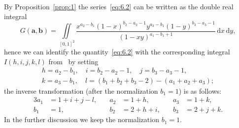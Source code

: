 \documentclass[a4paper,twoside]{article}
\numberwithin{equation}{section}
\renewcommand{\[}{\lfloor}
\renewcommand{\]}{\rfloor}
\newcommand{\<}{\langle}
\renewcommand{\>}{\rangle}
\renewcommand{\d}{\mathrm{d}}
\newcommand{\ba}{\boldsymbol a}
\newcommand{\bb}{\boldsymbol b}
\begin{document}
By Proposition~\ref{prop:1} the series~\eqref{eq:6.2} can be written
as the double real integral
$$
G(\ba,\bb)
=\iint\limits_{[0,1]^2}
\frac{x^{a_2-b_1}(1-x)^{b_2-a_2-1}y^{a_3-b_1}(1-y)^{b_3-a_3-1}}
{(1-xy)^{a_1-b_1+1}}\,\d x\,\d y,
$$
hence we can identify the quantity~\eqref{eq:6.2} with
the corresponding integral $I(h,i,j,k,l)$ from~\cite{RV2}
by setting
$$
\begin{gathered}
h=a_2-b_1, \quad i=b_2-a_2-1, \quad j=b_3-a_3-1,
\\
k=a_3-b_1, \quad l=(b_1+b_2+b_3-2)-(a_1+a_2+a_3);
\end{gathered}
$$
the inverse transformation (after the normalization $b_1=1$) is as
follows:
$$
\begin{alignedat}{3}{3}
a_1&=1+i+j-l, \quad& a_2&=1+h, \quad& a_3&=1+k,
\\
b_1&=1, \quad& b_2&=2+h+i, \quad& b_3&=2+j+k.
\end{alignedat}
$$
In the further discussion we keep the normalization $b_1=1$.
\end{document}
